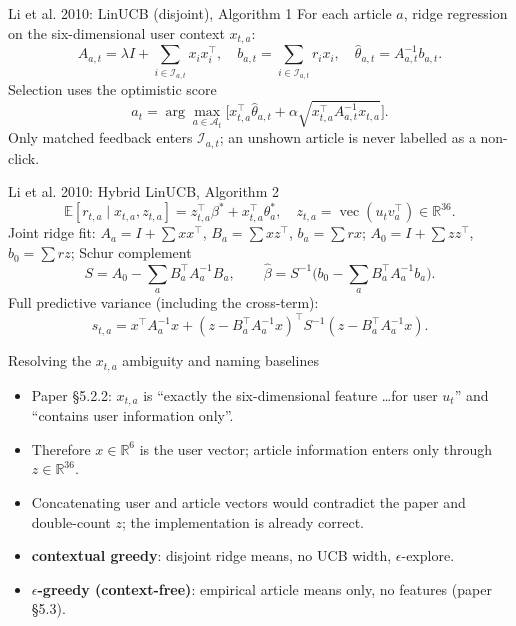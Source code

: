 \documentclass[10pt,aspectratio=169]{beamer}
\newcommand{\E}{\mathbb{E}}
\begin{document}
\begin{frame}{Li et al. 2010: LinUCB (disjoint), Algorithm 1}
For each article $a$, ridge regression on the six-dimensional user context $x_{t,a}$:
\[
A_{a,t}=\lambda I+\sum_{i\in\mathcal I_{a,t}}x_ix_i^\top,\quad
b_{a,t}=\sum_{i\in\mathcal I_{a,t}}r_ix_i,\quad
\hat\theta_{a,t}=A_{a,t}^{-1}b_{a,t}.
\]
Selection uses the optimistic score
\[
a_t=\arg\max_{a\in\mathcal A_t}\Big[x_{t,a}^\top\hat\theta_{a,t}
+\alpha\sqrt{x_{t,a}^\top A_{a,t}^{-1}x_{t,a}}\Big].
\]
Only matched feedback enters $\mathcal I_{a,t}$; an unshown article is never labelled as a non-click.
\end{frame}

\begin{frame}{Li et al. 2010: Hybrid LinUCB, Algorithm 2}
\[
\E[r_{t,a}\mid x_{t,a},z_{t,a}]=z_{t,a}^\top\beta^*+x_{t,a}^\top\theta_a^*,
\quad z_{t,a}=\operatorname{vec}(u_t v_a^\top)\in\mathbb R^{36}.
\]
Joint ridge fit: $A_a=I+\sum xx^\top$, $B_a=\sum xz^\top$, $b_a=\sum rx$;
$A_0=I+\sum zz^\top$, $b_0=\sum rz$; Schur complement
\[
S=A_0-\sum_a B_a^\top A_a^{-1}B_a,\qquad
\hat\beta=S^{-1}\Big(b_0-\sum_a B_a^\top A_a^{-1}b_a\Big).
\]
Full predictive variance (including the cross-term):
\[
s_{t,a}=x^\top A_a^{-1}x+(z-B_a^\top A_a^{-1}x)^\top S^{-1}(z-B_a^\top A_a^{-1}x).
\]
\end{frame}

\begin{frame}{Resolving the $x_{t,a}$ ambiguity and naming baselines}
\begin{itemize}
\item Paper \S5.2.2: $x_{t,a}$ is ``exactly the six-dimensional feature \ldots for user $u_t$'' and ``contains user information only''.
\item Therefore $x\in\mathbb R^6$ is the user vector; article information enters only through $z\in\mathbb R^{36}$.
\item Concatenating user and article vectors would contradict the paper and double-count $z$; the implementation is already correct.
\item \textbf{contextual greedy}: disjoint ridge means, no UCB width, $\epsilon$-explore.
\item \textbf{$\epsilon$-greedy (context-free)}: empirical article means only, no features (paper \S5.3).
\end{itemize}
\end{frame}
\end{document}
